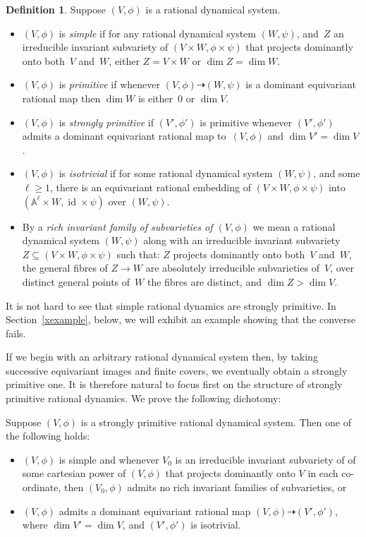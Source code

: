 \documentclass[\DocOpts]{amsart}
\theoremstyle{definition}
\newtheorem*{definition*}{Definition}
\newenvironment{customthm}[1]
  {\renewcommand\theinnercustomthm{#1}\innercustomthm}
  {\endinnercustomthm}
\renewcommand{\AA}{\mathbb{A}}
\providecommand{\id}{\operatorname{id}}
\newcommand{\<}{\langle}
\renewcommand{\>}{\rangle}
\newcommand{\dto}{\dashrightarrow}
\begin{document}
\begin{definition*}
\label{ad-def}
Suppose $(V,\phi)$ is a rational dynamical system.
\begin{itemize}
\item[(a)]
$(V,\phi)$ is {\em simple} if for any rational dynamical system $(W,\psi)$, and~$Z$ an irreducible invariant subvariety of $(V\times W,\phi\times\psi)$ that projects dominantly onto both~$V$ and~$W$, either $Z=V\times W$ or  $\dim Z=\dim W$.
\item[(b)]
$(V,\phi)$ is {\em primitive} if  whenever $(V,\phi)\dto(W,\psi)$ is a dominant equivariant rational map then $\dim W$ is either~$0$ or $\dim V$.
\item[(c)]
$(V,\phi)$ is {\em strongly primitive} if $(V',\phi')$ is primitive whenever $(V',\phi')$ admits a dominant equivariant rational map to~$(V,\phi)$ and $\dim V'=\dim V$.
\item[(d)]
$(V,\phi)$ is {\em isotrivial} if for some rational dynamical system $(W,\psi)$, and some $\ell\geq 1$,  there is an equivariant rational embedding of $(V\times W,\phi\times\psi)$  into $(\AA^\ell\times W,\id\times\psi)$ over $(W,\psi)$.
\item[(e)]
By a \emph{rich invariant family of subvarieties of $(V,\phi)$} we mean a rational dynamical system $(W,\psi)$ along with an irreducible invariant subvariety $Z\subseteq(V\times W,\phi\times\psi)$ such that:
$Z$ projects dominantly onto both~$V$ and~$W$, the general fibres of $Z\to W$ are absolutely irreducible subvarieties of~$V$, over distinct general points of~$W$ the fibres are distinct, and  
$\dim Z>\dim V$.
\end{itemize}
\end{definition*}

It is not hard to see that simple rational dynamics are strongly primitive.
In Section~\ref{xexample}, below, we will exhibit an example showing that the converse fails.

If we begin with an arbitrary rational dynamical system then, by taking successive equivariant images and finite covers, we eventually obtain a strongly primitive one.
It is therefore natural to focus first on the structure of strongly primitive rational dynamics.
We prove the following dichotomy:

\begin{customthm}{2}
\label{thm:primitive}
Suppose $(V,\phi)$ is a strongly primitive rational dynamical system.
Then one of the following holds:
\begin{itemize}
\item[(1)]
$(V,\phi)$ is simple and whenever $V_0$ is an irreducible invariant subvariety of of some cartesian power of $(V,\phi)$ that projects dominantly onto $V$ in each co-ordinate, then $(V_0,\phi)$ admits no rich invariant families of subvarieties, or
\item[(2)]
$(V,\phi)$ admits a dominant equivariant rational map $(V,\phi)\dto (V',\phi')$, where $\dim V'=\dim V$, and $(V',\phi')$ is isotrivial.
\end{itemize}
\end{customthm}
\end{document}
